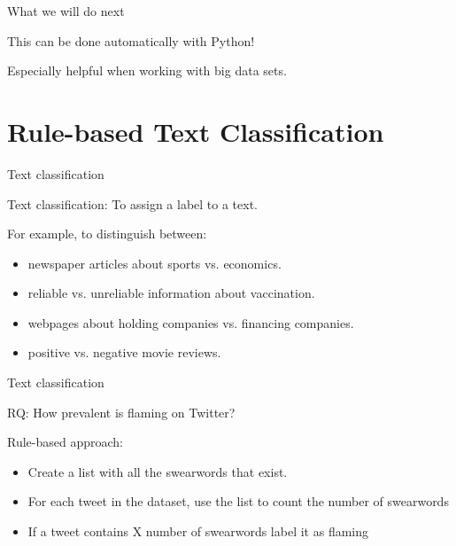 \documentclass[compress]{beamer}
\begin{document}
\begin{frame}[fragile]{What we will do next} 
	
This can be done automatically with Python!
	
Especially helpful when working with big data sets.
\end{frame}


\section{Rule-based Text Classification}

\begin{frame}[fragile]{Text classification}

Text classification: To assign a label to a text.

\pause
\normalsize

\begin{alertblock}{For example, to distinguish between:}
	\begin{itemize}
	\item newspaper articles about sports vs. economics.
	\item reliable vs. unreliable information about vaccination.
	\item webpages about holding companies vs. financing companies.
	\item positive vs. negative movie reviews.
\end{itemize}
\end{alertblock}
\end{frame}


\begin{frame}[fragile]{Text classification}
	
RQ: How prevalent is flaming on Twitter?
	
\pause
\normalsize
	
\begin{alertblock}{Rule-based approach:}
	\begin{itemize}
	\item Create a list with all the swearwords that exist.
	\item For each tweet in the dataset, use the list to count the number of swearwords	
	\item If a tweet contains X number of swearwords label it as flaming
	\end{itemize}
\end{alertblock}
\end{frame}
\end{document}

